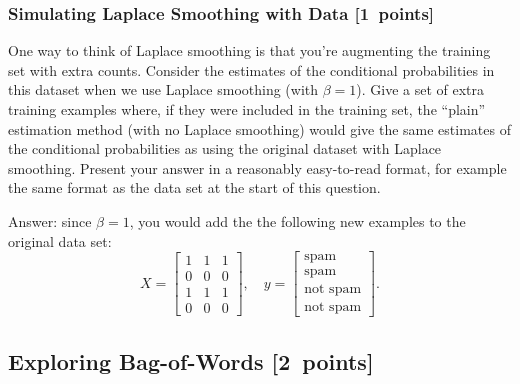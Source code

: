 \documentclass{article}
\newcommand{\blu}[1]{{\textcolor{blu}{#1}}}
\newcommand{\gre}[1]{\textcolor{gre}{#1}}
\newcommand\ans[1]{\par\gre{Answer: #1}}
\let\ask\blu
\newcommand\pts[1]{\textcolor{pointscolour}{[#1~points]}}
\begin{document}
    \subsubsection{Simulating Laplace Smoothing with Data \pts{1}}
    \label{laplace.conceptual}

    One way to think of Laplace smoothing is that you're augmenting the training set with extra counts. Consider the estimates of the conditional probabilities in this dataset when we use Laplace smoothing (with $\beta = 1$).
    \ask{Give a set of extra training examples where, if they were included in the training set, the ``plain'' estimation method (with no Laplace smoothing) would give the same estimates of the conditional probabilities as using the original dataset with Laplace smoothing.}
    Present your answer in a reasonably easy-to-read format, for example the same format as the data set at the start of this question.
    \ans{since $\beta = 1$, you would add the the following new examples to the original data set: 
    \[
    X = \begin{bmatrix}
        1 & 1 & 1\\
        0 & 0 & 0\\
        1 & 1 & 1\\
        0 & 0 & 0
    \end{bmatrix},
    \quad y = \begin{bmatrix}
        \text{spam}\\
        \text{spam}\\
        \text{not spam}\\
        \text{not spam}
    \end{bmatrix}.
    \]
    }

    \clearpage
    \subsection{Exploring Bag-of-Words \pts{2}}
\end{document}
